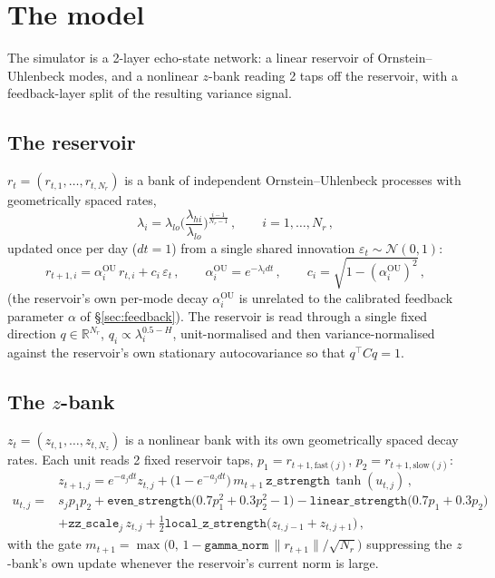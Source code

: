 \documentclass[11pt]{article}
\begin{document}
\section{The model}
\label{sec:model}
The simulator is a 2-layer echo-state network: a linear reservoir of
Ornstein--Uhlenbeck modes, and a nonlinear $z$-bank reading 2 taps off the
reservoir, with a feedback-layer split of the resulting variance signal.

\subsection{The reservoir}
$r_t=(r_{t,1},\dots,r_{t,N_r})$ is a bank of independent
Ornstein--Uhlenbeck processes with geometrically spaced rates,
\begin{equation}
\lambda_i = \lambda_{lo}\Big(\frac{\lambda_{hi}}{\lambda_{lo}}\Big)^{
\frac{i-1}{N_r-1}}\, ,\qquad i=1,\dots,N_r\, ,
\label{eq:lambdas}
\end{equation}
updated once per day ($dt=1$) from a single shared innovation
$\varepsilon_t\sim\mathcal N(0,1)$:
\begin{equation}
r_{t+1,i} = \alpha_i^{\text{OU}}\,r_{t,i} + c_i\,\varepsilon_t\, ,
\qquad \alpha_i^{\text{OU}}=e^{-\lambda_i dt}\, ,\qquad
c_i=\sqrt{1-(\alpha_i^{\text{OU}})^2}\, ,
\label{eq:reservoirupdate}
\end{equation}
(the reservoir's own per-mode decay $\alpha_i^{\text{OU}}$ is unrelated to
the calibrated feedback parameter $\alpha$ of \S\ref{sec:feedback}). The
reservoir is read through a single fixed direction $q\in\mathbb R^{N_r}$,
$q_i\propto\lambda_i^{0.5-H}$, unit-normalised and then
variance-normalised against the reservoir's own stationary autocovariance
so that $q^\top C q=1$.

\subsection{The $z$-bank}
$z_t=(z_{t,1},\dots,z_{t,N_z})$ is a nonlinear bank with its own
geometrically spaced decay rates. Each unit reads 2 fixed reservoir taps,
$p_1=r_{t+1,\text{fast}(j)}$, $p_2=r_{t+1,\text{slow}(j)}$:
\begin{equation}
z_{t+1,j} = e^{-a_j dt}z_{t,j} + \big(1-e^{-a_j dt}\big)\,
m_{t+1}\,\texttt{z\_strength}\,\tanh(u_{t,j})\, ,
\label{eq:zupdate}
\end{equation}
\begin{equation}
\begin{split}
u_{t,j} = {}& s_j p_1 p_2 + \texttt{even\_strength}\big(0.7p_1^2+0.3p_2^2-1\big)
-\texttt{linear\_strength}\big(0.7p_1+0.3p_2\big) \\
&+\texttt{zz\_scale}_j\,z_{t,j} + \tfrac12\texttt{local\_z\_strength}
\big(z_{t,j-1}+z_{t,j+1}\big)\, ,
\end{split}
\label{eq:udef}
\end{equation}
with the gate $m_{t+1}=\max\!\big(0,\,1-\texttt{gamma\_norm}\,
\lVert r_{t+1}\rVert/\sqrt{N_r}\big)$ suppressing the $z$-bank's own
update whenever the reservoir's current norm is large.
\end{document}
